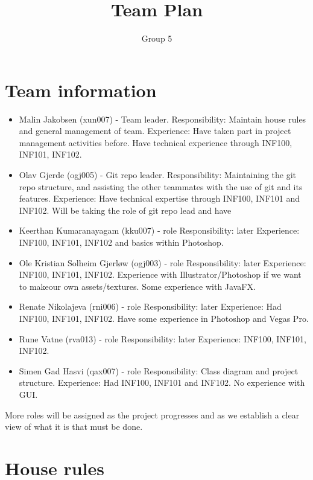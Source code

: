 \documentclass[12pt]{article}%
\begin{document}
\title{Team Plan}
\author{Group 5}
\date{}
\maketitle
\section{Team information}




\begin{itemize}
\item Malin Jakobsen (xun007) - Team leader. 
Responsibility: Maintain house rules and general management of team.
	Experience: Have taken part in project management activities before. Have technical
experience through INF100, INF101, INF102. 

\item Olav Gjerde (ogj005) - Git repo leader. 
Responsibility: Maintaining the git repo structure, and assisting the other teammates 
with the use of git and its features.
Experience: Have technical expertise through INF100, INF101 and INF102. Will be
taking the role of git repo lead and have 
\item Keerthan Kumaranayagam (kku007) -  {role}
Responsibility: {later}
Experience: INF100, INF101, INF102 and basics within Photoshop. 
\item Ole Kristian Solheim Gjerløw (ogj003) - {role}
Responsibility: {later}
Experience: INF100, INF101, INF102. Experience with Illustrator/Photoshop if we want to makeour own assets/textures. Some experience with JavaFX.
\item Renate Nikolajeva (rni006) - {role}
Responsibility: {later}
	Experience: Had INF100, INF101, INF102. Have some experience in Photoshop and
Vegas Pro. 

\item Rune Vatne  (rva013) - {role}
Responsibility: {later}
	Experience: INF100, INF101, INF102. 
\item Simen Gad Hasvi  (qax007) - {role}
Responsibility: Class diagram and project structure.
	Experience: Had INF100, INF101 and INF102. No experience with GUI.
\end{itemize}
        
More roles will be assigned as the project progresses and as we establish a clear view of what it is that must be done.


\section{House rules}
\end{document}
